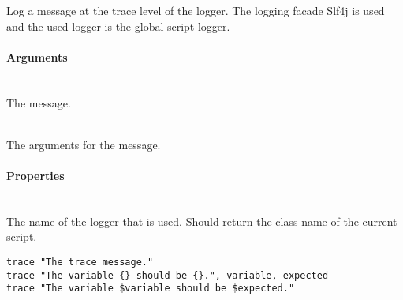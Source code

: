 %


Log a message at the trace level of the logger.
The logging facade Slf4j\cite{slf4j13} is used and the used logger is
the global script logger.

\paragraph{Arguments}

\begin{asparadesc}
%
\item[\code{message}] \hfill \\
The message.
%
\item[\code{args}] \hfill \\
The arguments for the message.
%
\end{asparadesc}

\paragraph{Properties}

\begin{asparadesc}
%
\item[\code{name}] \hfill \\
The name of the logger that is used. Should return the class name of the current
script.
%
\end{asparadesc}

\begin{lstlisting}[style=Groovybash, label={lst:example_trace}]
trace "The trace message."
trace "The variable {} should be {}.", variable, expected
trace "The variable $variable should be $expected."
\end{lstlisting}

